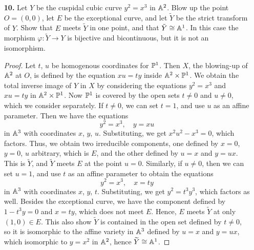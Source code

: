 \documentclass{article}
\begin{document}
\begin{enumerate} [label=\textbf{\arabic*.}, leftmargin=0cm]
\item[\textbf{10.}] Let $Y$ be the cuspidal cubic curve $y^2 = x^3$ in $\mathbb{A}^2$. Blow up the point $O = (0, 0)$, let $E$ be the exceptional curve, and let $\widetilde{Y}$ be the strict transform of $Y$. Show that $E$ meets $\widetilde{Y}$ in one point, and that $\tilde{Y} \cong \mathbb{A}^1$. In this case the morphism $\varphi : \widetilde{Y} \to Y$ is bijective and bicontinuous, but it is not an isomorphism.

\begin{proof}
    Let $t$, $u$ be homogenous coordinates for $\mathbb{P}^1$. Then $X$, the blowing-up of $\mathbb{A}^2$ at $O$, is defined by the equation $xu = ty$ inside $\mathbb{A}^2 \times \mathbb{P}^1$. We obtain the total inverse image of $Y$ in $X$ by considering the equations $y^2 = x^3$ and $xu = ty$ in $\mathbb{A}^2 \times \mathbb{P}^1$. Now $\mathbb{P}^1$ is covered by the open sets $t \neq 0$ and $u \neq 0$, which we consider separately. If $t \neq 0$, we can set $t = 1$, and use $u$ as an affine parameter. Then we have the equations
    \begin{equation*}
        y^2 = x^3, \quad y = xu
    \end{equation*}
    in $\mathbb{A}^3$ with coordinates $x$, $y$, $u$. Substituting, we get $x^2u^2 - x^3 = 0$, which factors. Thus, we obtain two irreducible components, one defined by $x = 0$, $y = 0$, $u$ arbitrary, which is $E$, and the other defined by $u = x$ and $y = ux$. This is $\widetilde{Y}$, and $\widetilde{Y}$ meets $E$ at the point $u = 0$. Similarly, if $u \neq 0$, then we can set $u = 1$, and use $t$ as an affine parameter to obtain the equations
    \begin{equation*}
        y^2 = x^3, \quad x = ty
    \end{equation*}
    in $\mathbb{A}^3$ with coordinates $x$, $y$, $t$. Substituting, we get $y^2 = t^3 y^3$, which factors as well. Besides the exceptional curve, we have the component defined by $1 - t^3 y = 0$ and $x = ty$, which does not meet $E$. Hence, $E$ meets $\widetilde{Y}$ at only $(1, 0) \in E$. This also show $\widetilde{Y}$ is contained in the open set defined by $t \neq 0$, so it is isomorphic to the affine variety in $\mathbb{A}^3$ defined by $u = x$ and $y = ux$, which isomorphic to $y = x^2$ in $\mathbb{A}^2$, hence $\widetilde{Y} \cong \mathbb{A}^1$.
\end{proof}

\end{enumerate}
\end{document}
